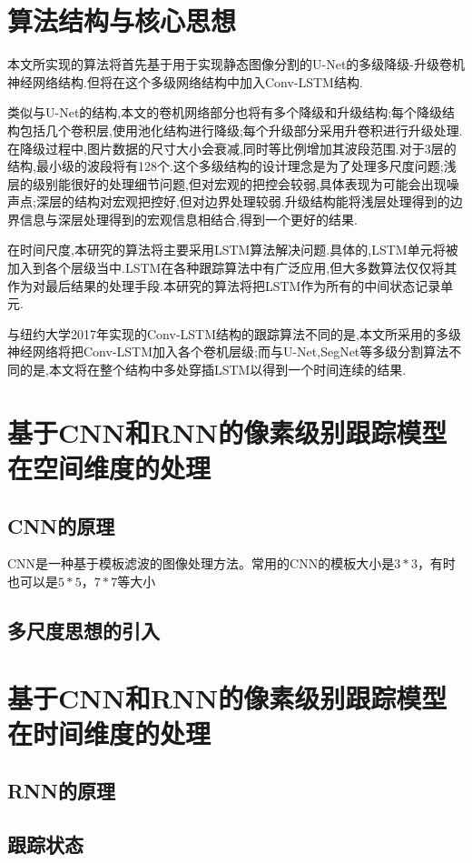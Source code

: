 \section{算法结构与核心思想}
本文所实现的算法将首先基于用于实现静态图像分割的U-Net\supercite{ronneberger2015u}的多级降级-升级卷机神经网络结构.但将在这个多级网络结构中加入Conv-LSTM结构.
\par
类似与U-Net的结构,本文的卷机网络部分也将有多个降级和升级结构;每个降级结构包括几个卷积层,使用池化结构进行降级;每个升级部分采用升卷积进行升级处理.在降级过程中,图片数据的尺寸大小会衰减,同时等比例增加其波段范围.对于3层的结构,最小级的波段将有128个.这个多级结构的设计理念是为了处理多尺度问题;浅层的级别能很好的处理细节问题,但对宏观的把控会较弱,具体表现为可能会出现噪声点;深层的结构对宏观把控好,但对边界处理较弱.升级结构能将浅层处理得到的边界信息与深层处理得到的宏观信息相结合,得到一个更好的结果.
\par
在时间尺度,本研究的算法将主要采用LSTM算法解决问题.具体的,LSTM单元将被加入到各个层级当中.LSTM在各种跟踪算法中有广泛应用,但大多数算法仅仅将其作为对最后结果的处理手段.本研究的算法将把LSTM作为所有的中间状态记录单元.
\par
与纽约大学2017年实现的Conv-LSTM结构的跟踪算法不同的是,本文所采用的多级神经网络将把Conv-LSTM加入各个卷机层级;而与U-Net,SegNet等多级分割算法不同的是,本文将在整个结构中多处穿插LSTM以得到一个时间连续的结果.
\section{基于CNN和RNN的像素级别跟踪模型在空间维度的处理}
\subsection{CNN的原理}
CNN是一种基于模板滤波的图像处理方法。常用的CNN的模板大小是$3*3$，有时也可以是$5*5$，$7*7$等大小
\subsection{多尺度思想的引入}
\section{基于CNN和RNN的像素级别跟踪模型在时间维度的处理}
\subsection{RNN的原理}
\subsection{跟踪状态}
